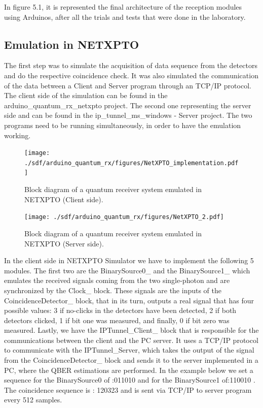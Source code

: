 \begin{refsection}
\begin{figure}[H]
	\end{figure}
	In figure 5.1, it is represented the final architecture  of the reception modules using Arduinos, after all the trials and tests that were done in the laboratory.
	
	\subsection{Emulation in NETXPTO }
	The first step was to simulate the acquisition of data sequence from the detectors and do the respective coincidence check. It was also simulated the communication of the data between a Client and Server program through an TCP/IP protocol. The client side of the simulation can be found in the arduino\_quantum\_rx\_netxpto project. The second one representing the server side and can be found in the ip\_tunnel\_ms\_windows - Server project. The two programs need to be running simultaneously, in order to have the emulation working.
	
	\begin{figure}[H]
		\centering
		\texttt{[image: ./sdf/arduino\_quantum\_rx/figures/NetXPTO\_implementation.pdf]}
		\caption{Block diagram of a quantum receiver system emulated in NETXPTO (Client side).}
		
		\label{fig:netxpto}
	\end{figure}
	
	\begin{figure}[H]
		\centering
		\texttt{[image: ./sdf/arduino\_quantum\_rx/figures/NetXPTO\_2.pdf]}
		\caption{Block diagram of a quantum receiver system emulated in NETXPTO (Server side).}
		\label{fig:netxpto}
	\end{figure}

    \clearpage
	
	In the client side in NETXPTO Simulator we have to implement the following 5 modules. The first two are the BinarySource0\_ and the BinarySource1\_ which emulates the received signals coming from the two single-photon and are synchronized by the Clock\_ block. These signals are the inputs of the CoincidenceDetector\_ block, that in its turn, outputs a real signal that has four possible values: 3 if no-clicks in the detectors have been detected, 2 if both detectors clicked, 1 if bit one was measured, and finally, 0 if bit zero was measured. Lastly, we have the IPTunnel\_Client\_ block that is responsible for the communications between the client and the PC server. It uses a TCP/IP protocol to communicate with the IPTunnel\_Server, which takes the output of the signal from the CoincidenceDetector\_ block and sends it to the server implemented in a PC, where the QBER estimations are performed. In the example below we set a sequence for the BinarySource0 of :011010  and for the BinarySource1 of:110010 . The coincidence sequence is : 120323 and is sent via TCP/IP to server program every 512 samples.
	

\end{refsection}
